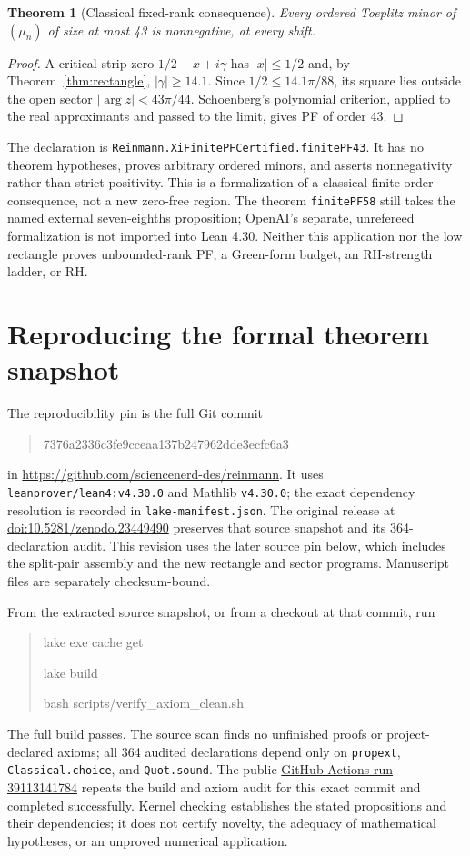 \documentclass[11pt]{amsart}
\newtheorem{theorem}{Theorem}[section]
\begin{document}
\begin{theorem}[Classical fixed-rank consequence]\label{thm:pf43}
Every ordered Toeplitz minor of $(\mu_n)$ of size at most 43 is nonnegative,
at every shift.
\end{theorem}
\begin{proof}
A critical-strip zero $1/2+x+i\gamma$ has $|x|\le1/2$ and, by
Theorem~\ref{thm:rectangle}, $|\gamma|\ge14.1$. Since
$1/2\le14.1\pi/88$, its square lies outside the open sector
$|\arg z|<43\pi/44$. Schoenberg's polynomial criterion, applied to the
real approximants and passed to the limit, gives PF of order 43.
\end{proof}
The declaration is \texttt{Reinmann.XiFinitePFCertified.finitePF43}.
It has no theorem hypotheses, proves arbitrary ordered minors, and asserts
nonnegativity rather than strict positivity. This is a formalization of a
classical finite-order consequence, not a new zero-free region. The theorem
\texttt{finitePF58} still takes the named external seven-eighths proposition;
OpenAI's separate, unrefereed formalization is not imported into Lean 4.30.
Neither this application nor the low rectangle proves unbounded-rank PF,
a Green-form budget, an RH-strength ladder, or RH.

\appendix
\section{Reproducing the formal theorem snapshot}\label{app:repro}
The reproducibility pin is the full Git commit
\begin{quote}\small\ttfamily
7376a2336c3fe9cceaa137b247962dde3ecfc6a3
\end{quote}
in \url{https://github.com/sciencenerd-des/reinmann}. It uses
\texttt{leanprover/lean4:v4.30.0} and Mathlib \texttt{v4.30.0}; the exact dependency
resolution is recorded in \texttt{lake-manifest.json}. The original release at
\href{https://doi.org/10.5281/zenodo.23449490}{doi:10.5281/zenodo.23449490}
preserves that source snapshot and its 364-declaration audit. This revision uses
the later source pin below, which includes the split-pair assembly and the new
rectangle and sector programs. Manuscript files are separately checksum-bound.

From the extracted source snapshot, or from a checkout at that commit, run
\begin{quote}\small\ttfamily\raggedright
lake exe cache get\par
lake build\par
bash scripts/verify\_axiom\_clean.sh
\end{quote}
The full build passes. The source scan finds no unfinished proofs or project-declared
axioms; all 364 audited declarations depend only on \texttt{propext},
\texttt{Classical.choice}, and \texttt{Quot.sound}. The public
\href{https://github.com/sciencenerd-des/reinmann/actions/runs/39113141784}{GitHub Actions run 39113141784}
repeats the build and axiom audit for this exact commit and completed successfully.
Kernel checking establishes the stated propositions and their dependencies; it
does not certify novelty, the adequacy of mathematical hypotheses, or an unproved
numerical application.
\end{document}
